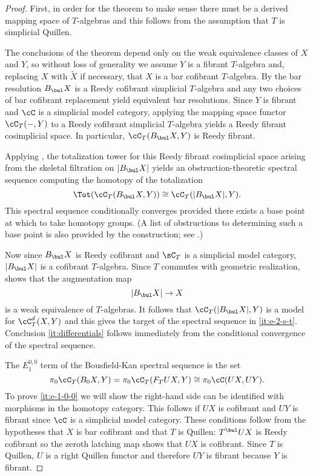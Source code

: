 \documentclass[leqno,oneside,english]{elsarticle}
\begin{document}
\begin{proof}
  First, in order for the theorem to make sense there must be a
  derived mapping space of $T$-algebras and this follows from the
  assumption that $T$ is simplicial Quillen. 

  The conclusions of the theorem depend only on the weak equivalence
  classes of $X$ and $Y$, so without loss of generality we assume $Y$
  is a fibrant $T$-algebra and, replacing $X$ with $\widetilde{X}$ if
  necessary, that $X$ is a bar cofibrant $T$-algebra.  By
   the bar resolution
  $B_{\bul}X$ is a Reedy cofibrant simplicial $T$-algebra and any two choices of bar cofibrant replacement yield equivalent bar resolutions. Since $Y$
  is fibrant and $\cC$ is a simplicial model category, applying the
  mapping space functor $\cC_T(-,Y)$ to a Reedy cofibrant simplicial
  $T$-algebra yields a Reedy fibrant cosimplicial space.  In
  particular, $\cC_T(B_{\bul}X, Y)$ is Reedy fibrant.

  Applying \cite{Bou89}, the totalization tower for this Reedy fibrant
  cosimplicial space arising from the skeletal filtration on
  $|B_{\bul}X|$ yields an obstruction-theoretic spectral sequence
  computing the homotopy of the totalization
  \[
  \Tot(\cC_T(B_{\bul}X, Y))\cong \cC_T(|B_{\bul}X|, Y).
  \] 
  This spectral sequence conditionally converges provided there exists
  a base point at which to take homotopy groups.  (A list of
  obstructions to determining such a base point is also provided by
  the construction; see .)

  Now since $B_{\bul}X$ is Reedy cofibrant and $\sC_T$ is a simplicial
  model category, $|B_{\bul} X|$ is a cofibrant $T$-algebra. Since $T$
  commutes with geometric realization,  shows
  that the augmentation map 
  \[ 
  |B_{\bul} X|\rightarrow X 
  \]
  is a weak equivalence of $T$-algebras.  It follows that
  $\cC_T(|B_{\bul}X|, Y)$ is a model for $\cC_T^d(X,Y)$ and this gives
  the target of the spectral sequence in \eqref{it:e-2-s-t}.
  Conclusion \eqref{it:differentials} follows immediately from the
  conditional convergence of the spectral sequence.

  The $E_1^{0,0}$ term of the Bousfield-Kan spectral sequence is the set
  \[\pi_0 \cC_T(B_0 X,Y)=\pi_0 \cC_T(F_T UX, Y)\cong \pi_0 \cC(UX,UY).\]
  To prove \eqref{it:e-1-0-0} we will show the right-hand side can be
  identified with morphisms in the homotopy category. This follows if
  $UX$ is cofibrant and $UY$ is fibrant since $\cC$ is a simplicial
  model category. These conditions follow from the hypotheses that $X$ is
  bar cofibrant and that $T$ is Quillen: $T^{\bul}UX$ is Reedy
  cofibrant so the zeroth latching map shows that $UX$ is cofibrant.
  Since $T$ is Quillen, $U$ is a right Quillen functor and therefore 
  $UY$ is fibrant because $Y$ is fibrant.


\end{proof}
\end{document}
